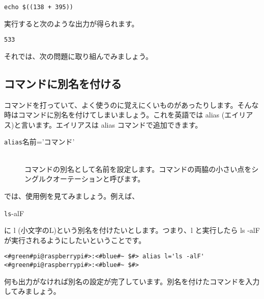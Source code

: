 \begin{lstlisting}[caption=echo コマンドを使った例, label=echo]
echo $((138 + 395))
\end{lstlisting}

実行すると次のような出力が得られます。

\begin{lstlisting}[caption=echo コマンドを実行した結果, label=echo_result]
533
\end{lstlisting}

それでは、次の問題に取り組んでみましょう。

\begin{enumerate}
\end{enumerate}

\subsection{コマンドに別名を付ける}

コマンドを打っていて、よく使うのに覚えにくいものがあったりします。そんな時はコマンドに別名を付けてしまいましょう。これを英語では alias (エイリアス)と言います。エイリアスは alias コマンドで追加できます。

\begin{description}
\item[\texttt{alias}\textvisiblespace 名前='コマンド']\mbox{}\\
コマンドの別名として名前を設定します。コマンドの両脇の小さい点をシングルクオーテーションと呼びます。
\end{description}

では、使用例を見てみましょう。例えば、

\begin{description}
\item[\texttt{ls}\textvisiblespace -alF]
\end{description}

に l (小文字のL)という別名を付けたいとします。つまり、l と実行したら ls -alF が実行されるようにしたいということです。

\begin{lstlisting}[caption=aliasコマンドの例, label=aliasCommandExample]
<#green#pi@raspberrypi#>:<#blue#~ $#> alias l='ls -alF'
<#green#pi@raspberrypi#>:<#blue#~ $#>
\end{lstlisting}

何も出力がなければ別名の設定が完了しています。別名を付けたコマンドを入力してみましょう。


